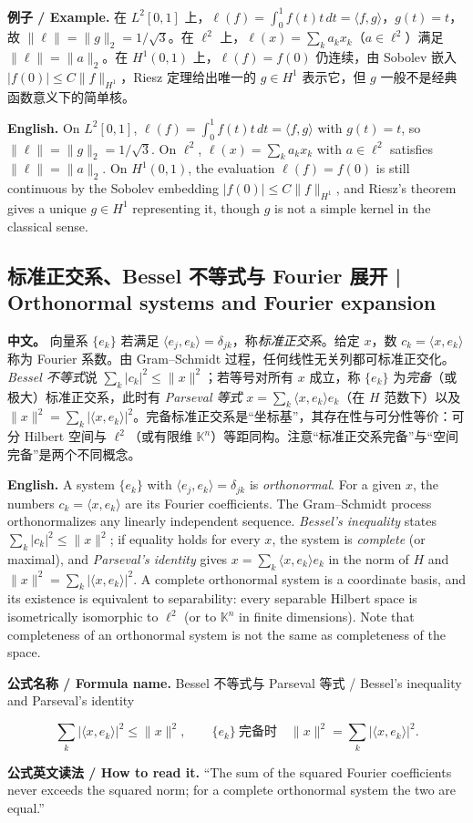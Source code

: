 \documentclass[UTF8,11pt,a4paper]{ctexart}
\newcommand{\EN}[1]{\par\noindent \textbf{English.} #1\par}
\newcommand{\READ}[1]{\par\noindent \textbf{公式英文读法 / How to read it.} #1\par}
\newcommand{\FORMULA}[2]{\par\noindent\textbf{公式名称 / Formula name.} #1 / #2\par}
\newcommand{\EX}[2]{\par\noindent \textbf{例子 / Example.} #1\par\EN{#2}}
\newcommand{\APS}[2]{\par\noindent\textbf{中文。} #1\par\noindent\textbf{English.} #2\par\smallskip}
\begin{document}
\EX{在 $L^2[0,1]$ 上，$\ell(f)=\int_0^1f(t)t\,dt=\langle f,g\rangle$，$g(t)=t$，故 $\|\ell\|=\|g\|_2=1/\sqrt3$。在 $\ell^2$ 上，$\ell(x)=\sum_ka_kx_k$（$a\in\ell^2$）满足 $\|\ell\|=\|a\|_2$。在 $H^1(0,1)$ 上，$\ell(f)=f(0)$ 仍连续，由 Sobolev 嵌入 $|f(0)|\le C\|f\|_{H^1}$，Riesz 定理给出唯一的 $g\in H^1$ 表示它，但 $g$ 一般不是经典函数意义下的简单核。}{On $L^2[0,1]$, $\ell(f)=\int_0^1f(t)t\,dt=\langle f,g\rangle$ with $g(t)=t$, so $\|\ell\|=\|g\|_2=1/\sqrt3$. On $\ell^2$, $\ell(x)=\sum_ka_kx_k$ with $a\in\ell^2$ satisfies $\|\ell\|=\|a\|_2$. On $H^1(0,1)$, the evaluation $\ell(f)=f(0)$ is still continuous by the Sobolev embedding $|f(0)|\le C\|f\|_{H^1}$, and Riesz's theorem gives a unique $g\in H^1$ representing it, though $g$ is not a simple kernel in the classical sense.}

\subsection{标准正交系、Bessel 不等式与 Fourier 展开 | Orthonormal systems and Fourier expansion}
\APS{向量系 $\{e_k\}$ 若满足 $\langle e_j,e_k\rangle=\delta_{jk}$，称\emph{标准正交系}。给定 $x$，数 $c_k=\langle x,e_k\rangle$ 称为 Fourier 系数。由 Gram--Schmidt 过程，任何线性无关列都可标准正交化。\emph{Bessel 不等式}说 $\sum_k|c_k|^2\le\|x\|^2$；若等号对所有 $x$ 成立，称 $\{e_k\}$ 为\emph{完备}（或极大）标准正交系，此时有 \emph{Parseval 等式} $x=\sum_k\langle x,e_k\rangle e_k$（在 $H$ 范数下）以及 $\|x\|^2=\sum_k|\langle x,e_k\rangle|^2$。完备标准正交系是“坐标基”，其存在性与可分性等价：可分 Hilbert 空间与 $\ell^2$（或有限维 $\mathbb K^n$）等距同构。注意“标准正交系完备”与“空间完备”是两个不同概念。}{A system $\{e_k\}$ with $\langle e_j,e_k\rangle=\delta_{jk}$ is \emph{orthonormal}. For a given $x$, the numbers $c_k=\langle x,e_k\rangle$ are its Fourier coefficients. The Gram--Schmidt process orthonormalizes any linearly independent sequence. \emph{Bessel's inequality} states $\sum_k|c_k|^2\le\|x\|^2$; if equality holds for every $x$, the system is \emph{complete} (or maximal), and \emph{Parseval's identity} gives $x=\sum_k\langle x,e_k\rangle e_k$ in the norm of $H$ and $\|x\|^2=\sum_k|\langle x,e_k\rangle|^2$. A complete orthonormal system is a coordinate basis, and its existence is equivalent to separability: every separable Hilbert space is isometrically isomorphic to $\ell^2$ (or to $\mathbb K^n$ in finite dimensions). Note that completeness of an orthonormal system is not the same as completeness of the space.}
\FORMULA{Bessel 不等式与 Parseval 等式}{Bessel's inequality and Parseval's identity}
\[
\sum_k|\langle x,e_k\rangle|^2\le\|x\|^2,
\qquad
\{e_k\}\ \text{完备时}\quad
\|x\|^2=\sum_k|\langle x,e_k\rangle|^2.
\]
\READ{``The sum of the squared Fourier coefficients never exceeds the squared norm; for a complete orthonormal system the two are equal.''}
\end{document}

